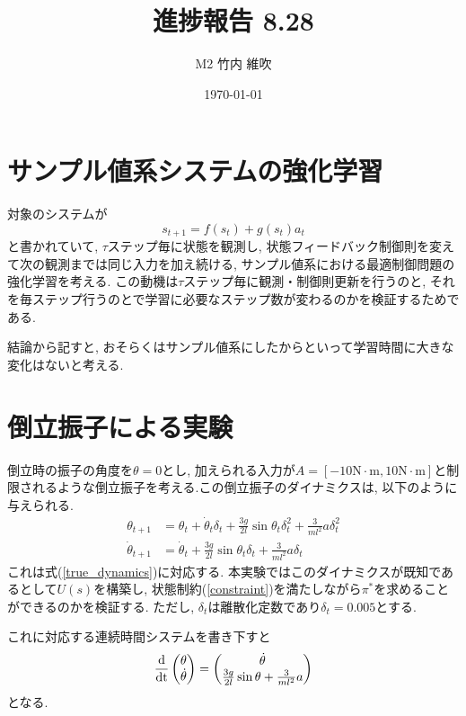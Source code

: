 \documentclass{jsarticle}
\title{\large{\bf{進捗報告 8.28}}}
\author{M2 竹内 維吹}
\date{\today}
\newcommand{\odif}[2]{\frac{\rm{d}#1}{\rm{d}#2}}
\begin{document}
\maketitle


\section{サンプル値系システムの強化学習}
対象のシステムが
\begin{equation}
	s_{t+1} = f(s_t) + g(s_t)a_t
\end{equation}
と書かれていて,  $\tau$ステップ毎に状態を観測し, 状態フィードバック制御則を変えて次の観測までは同じ入力を加え続ける, サンプル値系における最適制御問題の強化学習を考える. この動機は$\tau$ステップ毎に観測・制御則更新を行うのと, それを毎ステップ行うのとで学習に必要なステップ数が変わるのかを検証するためである.\par
結論から記すと, おそらくはサンプル値系にしたからといって学習時間に大きな変化はないと考える. 

\section{倒立振子による実験}
倒立時の振子の角度を$\theta=0$とし, 加えられる入力が$A=[-10\textrm{N}\cdot\textrm{m},10\textrm{N}\cdot\textrm{m}]$と制限されるような倒立振子を考える.この倒立振子のダイナミクスは, 以下のように与えられる.
\begin{align}
	\theta_{t+1} &= \theta_t+\dot{\theta}_t\delta_t+\frac{3g}{2l}\sin{\theta_t}\delta_t^2+\frac{3}{ml^2}a\delta_t^2 \\
	\dot{\theta}_{t+1} &=  \dot{\theta}_t+\frac{3g}{2l}\sin{\theta_t}\delta_t+\frac{3}{ml^2}a\delta_t
\end{align}
これは式(\ref{true_dynamics})に対応する. 本実験ではこのダイナミクスが既知であるとして$U(s)$を構築し, 状態制約(\ref{constraint})を満たしながら$\pi^{*}$を求めることができるのかを検証する. ただし, $\delta_t$は離散化定数であり$\delta_t=0.005$とする.\par
これに対応する連続時間システムを書き下すと
\begin{equation}
	\odif{}{t}\begin{pmatrix}\theta \\ \dot{\theta}\end{pmatrix} = 
		\begin{pmatrix}\dot{\theta} \\ \frac{3g}{2l}\sin{\theta} + \frac{3}{ml^2}a \end{pmatrix} \label{continuous}
\end{equation}
となる. 
\end{document}
